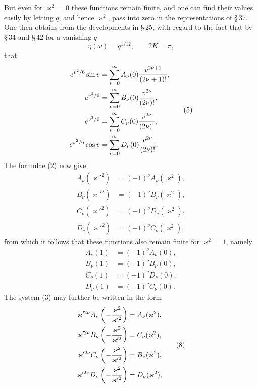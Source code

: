 \documentclass[11pt]{article}
\begin{document}
But even for $\varkappa^2=0$ these functions remain finite, and one can find their values easily by letting $q$, and hence $\varkappa^2$, pass into zero in the representations of \S\,37. One then obtains from the developments in \S\,25, with regard to the fact that by \S\,34 and \S\,42 for a vanishing $q$
\[
\eta(\omega)=q^{1/12},
\qquad
2K=\pi,
\]
that
\begin{equation}
\begin{aligned}
e^{v^2/6}\sin v&=\sum_{\nu=0}^{\infty}A_\nu(0){v^{2\nu+1}\over(2\nu+1)!},\\
e^{v^2/6}&=\sum_{\nu=0}^{\infty}B_\nu(0){v^{2\nu}\over(2\nu)!},\\
e^{v^2/6}&=\sum_{\nu=0}^{\infty}C_\nu(0){v^{2\nu}\over(2\nu)!},\\
e^{v^2/6}\cos v&=\sum_{\nu=0}^{\infty}D_\nu(0){v^{2\nu}\over(2\nu)!}.
\end{aligned}
\tag{5}
\end{equation}
The formulae (2) now give
\begin{equation}
\begin{aligned}
A_\nu(\varkappa'^2)&=(-1)^\nu A_\nu(\varkappa^2),\\
B_\nu(\varkappa'^2)&=(-1)^\nu B_\nu(\varkappa^2),\\
C_\nu(\varkappa'^2)&=(-1)^\nu D_\nu(\varkappa^2),\\
D_\nu(\varkappa'^2)&=(-1)^\nu C_\nu(\varkappa^2),
\end{aligned}
\tag{6}
\end{equation}
from which it follows that these functions also remain finite for $\varkappa^2=1$, namely
\begin{equation}
\begin{aligned}
A_\nu(1)&=(-1)^\nu A_\nu(0),\\
B_\nu(1)&=(-1)^\nu B_\nu(0),\\
C_\nu(1)&=(-1)^\nu D_\nu(0),\\
D_\nu(1)&=(-1)^\nu C_\nu(0).
\end{aligned}
\tag{7}
\end{equation}
The system (3) may further be written in the form
\begin{equation}
\begin{aligned}
\varkappa'^{2\nu}A_\nu\left(-{\varkappa^2\over\varkappa'^2}\right)&=A_\nu(\varkappa^2),\\
\varkappa'^{2\nu}B_\nu\left(-{\varkappa^2\over\varkappa'^2}\right)&=C_\nu(\varkappa^2),\\
\varkappa'^{2\nu}C_\nu\left(-{\varkappa^2\over\varkappa'^2}\right)&=B_\nu(\varkappa^2),\\
\varkappa'^{2\nu}D_\nu\left(-{\varkappa^2\over\varkappa'^2}\right)&=D_\nu(\varkappa^2),
\end{aligned}
\tag{8}
\end{equation}
\end{document}

